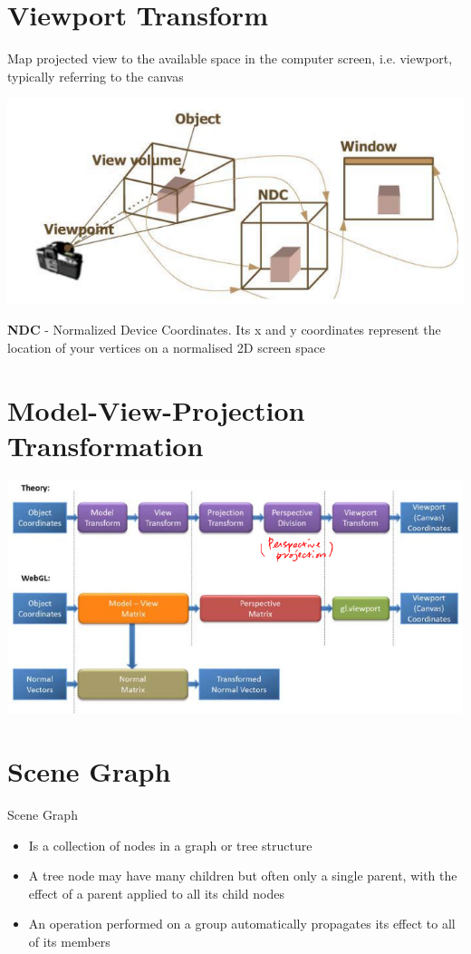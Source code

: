 \documentclass{article}[18pt]
\begin{document}
\section{Viewport Transform}
Map projected view to the available space in the computer screen, i.e. viewport, typically referring to the canvas
\begin{center}
	\includegraphics[scale=0.7]{"Viewport Transform"}
\end{center}
\textbf{NDC} - Normalized Device Coordinates. Its x and y coordinates represent the location of your vertices on a normalised 2D screen space
\section{Model-View-Projection Transformation}
\begin{center}
	\includegraphics[scale=0.7]{"Model-View-Projection Transformation"}
\end{center}
\section{Scene Graph}
Scene Graph
\begin{itemize}
	\item Is a collection of nodes in a graph or tree structure
	\item A tree node may have many children but often only a single parent, with the effect of a parent applied to all its child nodes
	\item An operation performed on a group automatically propagates its effect to all of its members
\end{itemize}
\end{document}
